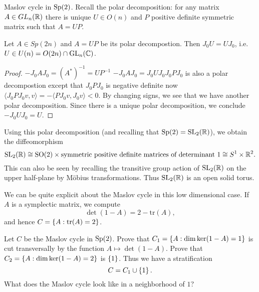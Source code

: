\begin{clear}{Maslov cycle in $\mathrm{Sp}(2)$.}
  Recall the polar decomposition: for any matrix $A\in GL_n(\mathbb{R})$ there is
unique $U\in O(n)$ and $P$ positive definite symmetric matrix such
that $A=UP$.
\begin{claim}
  Let $A\in Sp(2n)$ and $A=UP$ be its polar decompostion. Then
  $J_0U=UJ_0$, i.e.\ $U\in U(n)=O(2n)\cap \mathrm{GL}_{n}(\mathbb{C})$. 
\end{claim}
\begin{proof}
$-J_0AJ_0=(A^*)^{-1}=UP^{-1}$
$-J_0AJ_0=J_0UJ_0J_0PJ_0$ is also a polar decompostion except that $J_0PJ_0$ is negative definite now 
$\langle J_0PJ_0v,v\rangle=-\langle PJ_0v, J_0v\rangle<0$. By changing
signs, we see that we have another polar decomposition. Since there is
a unique polar decomposition, we conclude $-J_0UJ_0=U$.
\end{proof}
Using this polar decomposition (and recalling that
$\mathrm{Sp}(2)=\text{SL}_{2}(\mathbb{R})$), we obtain the diffeomorphism
$$\mathrm{SL}_{2}(\mathbb{R})\cong \mathrm{SO}(2)\times \text{symmetric
  positive definite matrices of determinant 1}\cong S^1\times \mathbb{R}^2.$$
This can also be seen by recalling the transitive group action of
$\mathrm{SL}_{2}(\mathbb{R})$ on the upper half-plane by M\"obius
transformations. Thus $\mathrm{SL}_2(\mathbb{R})$ is an open solid torus.

We can be quite explicit about the Maslov cycle in this low
dimensional case. If $A$ is a symplectic matrix, we compute
\begin{equation*}
  \det(1-A)=2-\text{tr}(A),
\end{equation*}
and hence $C=\left\{A:\text{tr}(A)=2\right\}$. 
\end{clear}
\begin{xca}
  Let $C$ be the Maslov cycle in $\mathrm{Sp}(2)$. Prove that
  $C_{1}=\left\{A:\dim \ker(1-A)=1\right\}$ is cut transversally by the
  function $A\mapsto \det(1-A)$. Prove that
  $C_{2}=\left\{A:\dim\ker(1-A)=2\right\}$ is $\left\{1\right\}$. Thus we have a
  stratification
  \begin{equation*}
    C=C_{1}\cup \left\{1\right\}.
  \end{equation*}
  What does the Maslov cycle look like in a neighborhood of $1$?
\end{xca}